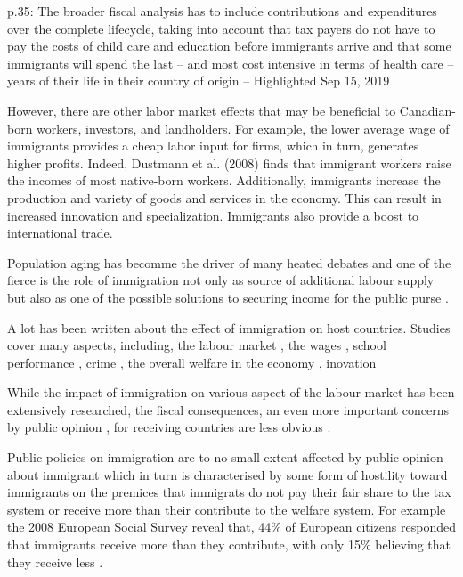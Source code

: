 p.35: The broader fiscal analysis has to include contributions and expenditures over the complete lifecycle, taking into account that tax payers do not have to pay the costs of child care and education before immigrants arrive and that some immigrants will spend the last – and most cost intensive in terms of health care – years of their life in their country of origin -- Highlighted Sep 15, 2019

However, there are other labor market effects that may be beneficial to Canadian-born workers, investors, and landholders. For example, the lower average wage of immigrants provides a cheap labor input for firms, which in turn, generates higher profits. Indeed, Dustmann et al. (2008) finds that immigrant workers raise the incomes of most native-born workers. Additionally, immigrants increase the production and variety of goods and services in the economy. This can result in increased innovation and specialization. Immigrants also provide a boost to international trade. \citep{Javdani:2013gu}


Population aging has becomme the driver of many heated debates and one of the fierce is the role of immigration not only as source of additional labour supply but also as one of the possible solutions to securing income for the public purse \citep{Hansen:2017uz}.


  A lot has been written about the effect of immigration on host countries. Studies cover many aspects, including, the labour market \citep{Borjas:2003cr,Dustmann:2016by}, the wages \citep{Dustmann:2013hk,Eberhard:2012te},  school performance \citep{Brunello:2013cy}, crime \citep{Chalfin:2015fb}, the overall welfare in the economy \citep{Ileri:2019hf,Akin:gh,Dungan:2013jp,Fougere:2011ht}, inovation \citep{Hunt:2008fn,Partridge:2008up}



  While the impact of immigration on various aspect of the labour market has been extensively researched, the fiscal consequences, an even more important concerns by public opinion \citep{Dustmann:2014dr}, for receiving countries are less obvious \citep{Preston:2014uw}.

  Public policies on immigration are to no small extent affected by public opinion about immigrant which in turn is characterised by some form of hostility toward immigrants on the premices that immigrats do not pay their fair share to the tax system or receive more than their contribute to the welfare system\citep{Dustmann:2007fl}. For example the 2008 European Social Survey reveal that, 44\% of European citizens responded that immigrants receive more than they contribute, with only 15\% believing that they receive less \citep{Dustmann:2014dr}.

